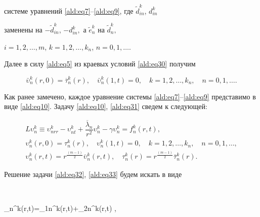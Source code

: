 системе уравнений \eqref{ald:eq7}--\eqref{ald:eq9}, где $\tilde{d}_{in}^k$, $d_{in}^k$

заменены на $-\tilde{d}_{in}^k$, $-d_{in}^k,$ а $\tilde{e}_n^k$ на $\tilde{d}_n^k,$ 

$i= 1,2, \dots,m$, $k =1,2, \dots, k_{n}$, $n=0,1,\dots.$



Далее в силу \eqref{ald:eq5} из краевых условий \eqref{ald:eq30}  получим

\begin{equation}

\bar{\upsilon}_n^k (r,0) = \overline{\tau}_n^k(r),\quad 

\bar{\upsilon}_n^k (1,t)=0,\quad k =1,2, \dots, k_{n},\quad n = 0,1,\dots .

 \label{ald:eq31}

\end{equation}



Как ранее замечено, каждое уравнение системы \eqref{ald:eq7}--\eqref{ald:eq9} представимо в виде \eqref{ald:eq10}. Задачу \eqref{ald:eq10}, \eqref{ald:eq31} сведем к следующей:

\begin{gather}

\label{ald:eq32}

L\upsilon_n^k \equiv  \upsilon_{nrr}^k -\upsilon_{nt}^k + \dfrac{\overline{\lambda}_n}{r^2}\upsilon_n^k - \gamma

\upsilon_n^k = f_n^k(r,t),

\\

\label{ald:eq33}

\upsilon_n^k(r,0)= \tau_n^k(r),\quad 

\upsilon_n^k(1,t) = 0,\quad k =1,2, \dots, k_{n},\quad n = 0,1,\dots, 

\\

\upsilon_n^k(r,t)= r^{\frac{(m-1)}{2}}\bar{\upsilon}_n^k (r,t),

\quad 

\tau_n^k(r)= r^{\frac{(m-1)}{2}}\bar{\tau}_n^k(r).

\end{gather}



Решение задачи \eqref{ald:eq32}, \eqref{ald:eq33} будем искать в виде

$$

\upsilon_{n}^k(r,t)=\upsilon_{1n}^k(r,t)+\upsilon_{2n}^k(r,t) ,

